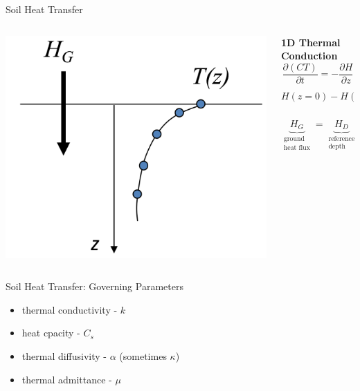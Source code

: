 \begin{frame}{Soil Heat Transfer}
\begin{columns}[T]
    \begin{column}{.4\textwidth}
    \begin{minipage}[c][0.8\textheight][c]{\linewidth}
    \includegraphics[width=1\textwidth]{fig5.png}
    \end{minipage}
    \end{column}
    \begin{column}{.6\textwidth}
    \begin{minipage}[c][0.8\textheight][c]{\linewidth}
    {\large \textbf{1D Thermal Conduction}}
    $$\frac{\partial (CT)}{\partial t} = -\frac{\partial H}{\partial z}$$
    $$H(z=0) - H(z=D) = \int^{z=D}_{z=0} \frac{\partial (CT)}{\partial t} dz$$
    $$\underbrace{H_G}_{\substack{\text{ground}\\\text{heat flux}}} = \underbrace{H_D}_{\substack{\text{reference}\\\text{depth}}} + \underbrace{\int^{z=D}_{z=0} \frac{\partial (CT)}{\partial t} dz}_{\text{storage}}$$
      \end{minipage}
    \end{column}
  \end{columns} 
\end{frame}


\begin{frame}{Soil Heat Transfer: Governing Parameters}
\begin{itemize}
	\item thermal conductivity - $k$
	\item heat cpacity - $C_s$
	\item thermal diffusivity - $\alpha$ (sometimes $\kappa$)
	\item thermal admittance - $\mu$	
\end{itemize}
\end{frame}

